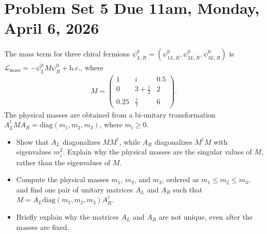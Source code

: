 \section*{Problem Set 5 Due 11am, Monday, April 6, 2026}


The mass term for three chiral fermions $\psi_{L,R}^0 = (\psi^0_{1L,R}, \psi^0_{2L,R}, \psi^0_{3L,R})$ is $\mathcal{L}_{\text{mass}}=-\overline{\psi_L^0} M \psi_R^0 + \text{h.c.}$, where 
\begin{align}
    M=\begin{pmatrix}
        1 & i & 0.5\\
        0 & 3 +\frac{i}{2} & 2\\
        0.25 & \frac{i}{7}& 6 
    \end{pmatrix}.
\end{align}
The physical masses are obtained from a bi-unitary transformation $A_L^\dagger M A_R = \text{diag}(m_1, m_2, m_3)$, where $m_i\geq 0$.

\begin{itemize}
    \item [(a)] Show that $A_L$ diagonalizes $M M^\dagger$, while $A_R$ diagonalizes $M^\dagger M$ with eigenvalues $m_i^2$. Explain why the physical masses are the singular values of $M$, rather than the eigenvalues of $M$. 
    \item [(b)] Compute the physical masses $m_1$, $m_2$, and $m_3$, ordered as $m_1\leq m_2 \leq m_3$, and find one pair of unitary matrices $A_L$ and $A_R$ such that $M=A_L \text{diag}(m_1, m_2, m_3) A_R^\dagger$.
    \item [(c)] Briefly explain why the matrices $A_L$ and $A_R$ are not unique, even after the masses are fixed.
\end{itemize}

